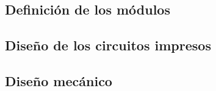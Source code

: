 \documentclass[../../main.tex]{subfiles}
\begin{document}
\subsection{Definición de los módulos}\label{subsec:def_mods}


\subsection{Diseño de los circuitos impresos}\label{subsec:dis_pcbs}


\subsection{Diseño mecánico}\label{subsec:dis_mec}

\end{document}
